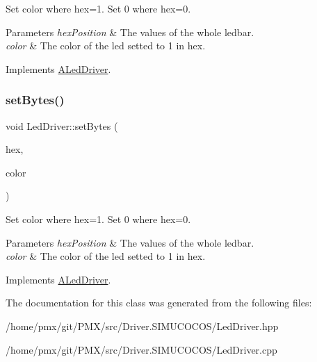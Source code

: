Set color where hex=1. Set 0 where hex=0. 


\begin{DoxyParams}{Parameters}
{\em hex\+Position} & The values of the whole ledbar. \\
\hline
{\em color} & The color of the led setted to 1 in hex. \\
\hline
\end{DoxyParams}


Implements \hyperlink{classALedDriver_a3a219f7546870d4bce0ae36cad3b0518}{A\+Led\+Driver}.

\mbox{\label{classLedDriver_a765b8b642e13715ccaff1cbcff01dc97}} 
\subsubsection{\texorpdfstring{set\+Bytes()}{setBytes()}\hspace{0.1cm}{\footnotesize\ttfamily [6/6]}}
{\footnotesize\ttfamily void Led\+Driver\+::set\+Bytes (\begin{DoxyParamCaption}\item[{uint}]{hex,  }\item[{Led\+Color}]{color }\end{DoxyParamCaption})\hspace{0.3cm}{\ttfamily [virtual]}}



Set color where hex=1. Set 0 where hex=0. 


\begin{DoxyParams}{Parameters}
{\em hex\+Position} & The values of the whole ledbar. \\
\hline
{\em color} & The color of the led setted to 1 in hex. \\
\hline
\end{DoxyParams}


Implements \hyperlink{classALedDriver_a3a219f7546870d4bce0ae36cad3b0518}{A\+Led\+Driver}.



The documentation for this class was generated from the following files\+:\begin{DoxyCompactItemize}
\item 
/home/pmx/git/\+P\+M\+X/src/\+Driver.\+S\+I\+M\+U\+C\+O\+C\+O\+S/Led\+Driver.\+hpp\item 
/home/pmx/git/\+P\+M\+X/src/\+Driver.\+S\+I\+M\+U\+C\+O\+C\+O\+S/Led\+Driver.\+cpp\end{DoxyCompactItemize}
